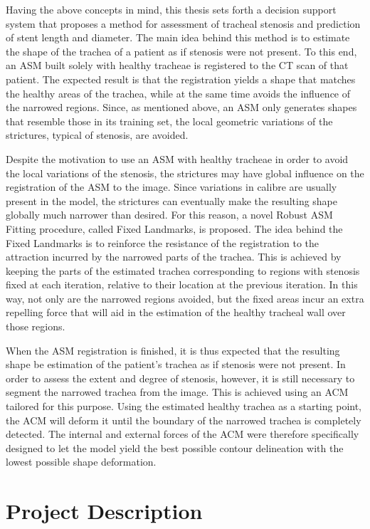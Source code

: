 \documentclass[a4paper]{article}
\begin{document}
Having the above concepts in mind, this thesis sets forth a decision support
system that proposes a method for assessment of tracheal stenosis and
prediction of stent length and diameter. The main idea behind this method
is to estimate the shape of the trachea of a patient as if stenosis were not
present. To this end, an ASM built solely with healthy tracheae is registered
to the CT scan of that patient. The expected result is that the registration
yields a shape that matches the healthy areas of the trachea, while at the
same time avoids the influence of the narrowed regions. Since, as mentioned
above, an ASM only generates shapes that resemble those in its training
set, the local geometric variations of the strictures, typical of stenosis, are
avoided.

Despite the motivation to use an ASM with healthy tracheae in order
to avoid the local variations of the stenosis, the strictures may have global
influence on the registration of the ASM to the image. Since variations in
calibre are usually present in the model, the strictures can eventually make
the resulting shape globally much narrower than desired. For this reason, a
novel Robust ASM Fitting procedure, called Fixed Landmarks, is proposed.
The idea behind the Fixed Landmarks is to reinforce the resistance of the
registration to the attraction incurred by the narrowed parts of the trachea.
This is achieved by keeping the parts of the estimated trachea corresponding
to regions with stenosis fixed at each iteration, relative to their location
at the previous iteration. In this way, not only are the narrowed regions
avoided, but the fixed areas incur an extra repelling force that will aid in
the estimation of the healthy tracheal wall over those regions.

When the ASM registration is finished, it is thus expected that the
resulting shape be estimation of the patient’s trachea as if stenosis were
not present. In order to assess the extent and degree of stenosis, however,
it is still necessary to segment the narrowed trachea from the image.
This is achieved using an ACM tailored for this purpose. Using the estimated
healthy trachea as a starting point, the ACM will deform it until the
boundary of the narrowed trachea is completely detected. The internal and
external forces of the ACM were therefore specifically designed to let the
model yield the best possible contour delineation with the lowest possible
shape deformation.

\section{Project Description}
\end{document}

